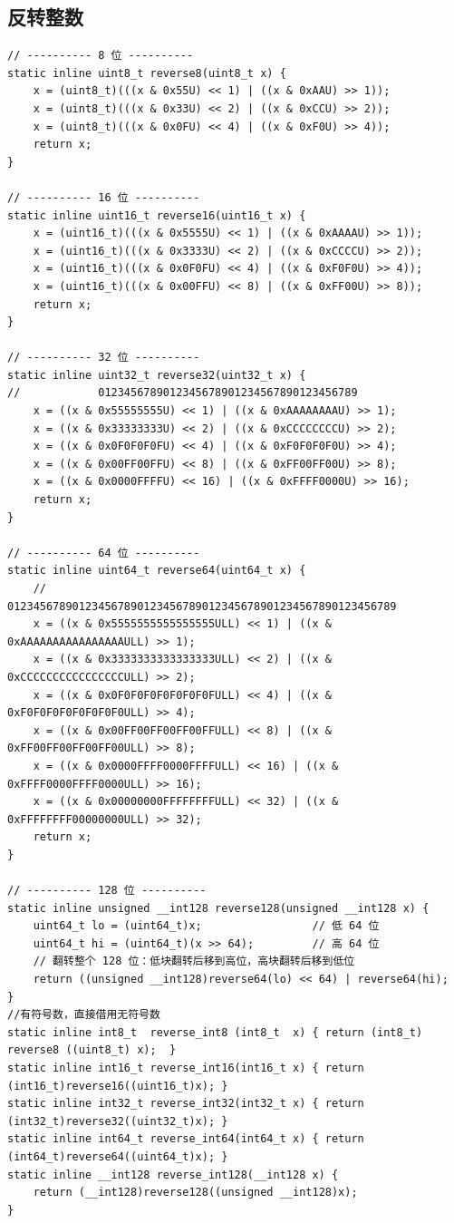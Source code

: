 \subsection{反转整数}

\begin{lstlisting}
// ---------- 8 位 ----------
static inline uint8_t reverse8(uint8_t x) {
    x = (uint8_t)(((x & 0x55U) << 1) | ((x & 0xAAU) >> 1));
    x = (uint8_t)(((x & 0x33U) << 2) | ((x & 0xCCU) >> 2));
    x = (uint8_t)(((x & 0x0FU) << 4) | ((x & 0xF0U) >> 4));
    return x;
}

// ---------- 16 位 ----------
static inline uint16_t reverse16(uint16_t x) {
    x = (uint16_t)(((x & 0x5555U) << 1) | ((x & 0xAAAAU) >> 1));
    x = (uint16_t)(((x & 0x3333U) << 2) | ((x & 0xCCCCU) >> 2));
    x = (uint16_t)(((x & 0x0F0FU) << 4) | ((x & 0xF0F0U) >> 4));
    x = (uint16_t)(((x & 0x00FFU) << 8) | ((x & 0xFF00U) >> 8));
    return x;
}

// ---------- 32 位 ----------
static inline uint32_t reverse32(uint32_t x) {
//            0123456789012345678901234567890123456789
    x = ((x & 0x55555555U) << 1) | ((x & 0xAAAAAAAAU) >> 1);
    x = ((x & 0x33333333U) << 2) | ((x & 0xCCCCCCCCU) >> 2);
    x = ((x & 0x0F0F0F0FU) << 4) | ((x & 0xF0F0F0F0U) >> 4);
    x = ((x & 0x00FF00FFU) << 8) | ((x & 0xFF00FF00U) >> 8);
    x = ((x & 0x0000FFFFU) << 16) | ((x & 0xFFFF0000U) >> 16);
    return x;
}

// ---------- 64 位 ----------
static inline uint64_t reverse64(uint64_t x) {
    //        012345678901234567890123456789012345678901234567890123456789
    x = ((x & 0x5555555555555555ULL) << 1) | ((x & 0xAAAAAAAAAAAAAAAAULL) >> 1);
    x = ((x & 0x3333333333333333ULL) << 2) | ((x & 0xCCCCCCCCCCCCCCCCULL) >> 2);
    x = ((x & 0x0F0F0F0F0F0F0F0FULL) << 4) | ((x & 0xF0F0F0F0F0F0F0F0ULL) >> 4);
    x = ((x & 0x00FF00FF00FF00FFULL) << 8) | ((x & 0xFF00FF00FF00FF00ULL) >> 8);
    x = ((x & 0x0000FFFF0000FFFFULL) << 16) | ((x & 0xFFFF0000FFFF0000ULL) >> 16);
    x = ((x & 0x00000000FFFFFFFFULL) << 32) | ((x & 0xFFFFFFFF00000000ULL) >> 32);
    return x;
}

// ---------- 128 位 ----------
static inline unsigned __int128 reverse128(unsigned __int128 x) {
    uint64_t lo = (uint64_t)x;                 // 低 64 位
    uint64_t hi = (uint64_t)(x >> 64);         // 高 64 位
    // 翻转整个 128 位：低块翻转后移到高位，高块翻转后移到低位
    return ((unsigned __int128)reverse64(lo) << 64) | reverse64(hi);
}
//有符号数，直接借用无符号数
static inline int8_t  reverse_int8 (int8_t  x) { return (int8_t) reverse8 ((uint8_t) x);  }
static inline int16_t reverse_int16(int16_t x) { return (int16_t)reverse16((uint16_t)x); }
static inline int32_t reverse_int32(int32_t x) { return (int32_t)reverse32((uint32_t)x); }
static inline int64_t reverse_int64(int64_t x) { return (int64_t)reverse64((uint64_t)x); }
static inline __int128 reverse_int128(__int128 x) {
    return (__int128)reverse128((unsigned __int128)x);
}
\end{lstlisting}


